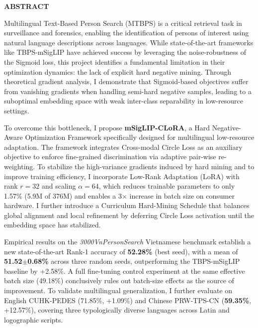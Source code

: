 \documentclass[../main.tex]{subfiles}
\begin{document}
\begin{center}
    \Large\textbf{ABSTRACT}
\end{center}

\vspace{1cm}


\noindent Multilingual Text-Based Person Search (MTBPS) is a critical retrieval task in surveillance and forensics, enabling the identification of persons of interest using natural language descriptions across languages. While state-of-the-art frameworks like TBPS-mSigLIP have achieved success by leveraging the noise-robustness of the Sigmoid loss, this project identifies a fundamental limitation in their optimization dynamics: the lack of explicit hard negative mining. Through theoretical gradient analysis, I demonstrate that Sigmoid-based objectives suffer from vanishing gradients when handling semi-hard negative samples, leading to a suboptimal embedding space with weak inter-class separability in low-resource settings.

\noindent To overcome this bottleneck, I propose \textbf{mSigLIP-CLoRA}, a Hard Negative-Aware Optimization Framework specifically designed for multilingual low-resource adaptation. The framework integrates Cross-modal Circle Loss as an auxiliary objective to enforce fine-grained discrimination via adaptive pair-wise re-weighting. To stabilize the high-variance gradients induced by hard mining and to improve training efficiency, I incorporate Low-Rank Adaptation (LoRA) with rank $r{=}32$ and scaling $\alpha{=}64$, which reduces trainable parameters to only 1.57\% (5.9M of 376M) and enables a 3$\times$ increase in batch size on consumer hardware. I further introduce a Curriculum Hard-Mining Schedule that balances global alignment and local refinement by deferring Circle Loss activation until the embedding space has stabilized.

\noindent Empirical results on the \textit{3000VnPersonSearch} Vietnamese benchmark establish a new state-of-the-art Rank-1 accuracy of \textbf{52.28\%} (best seed), with a mean of \textbf{51.52$\pm$0.68\%} across three random seeds, outperforming the TBPS-mSigLIP baseline by +2.58\%. A full fine-tuning control experiment at the same effective batch size (49.18\%) conclusively rules out batch-size effects as the source of improvement. To validate multilingual generalization, I further evaluate on English CUHK-PEDES (71.85\%, +1.09\%) and Chinese PRW-TPS-CN (\textbf{59.35\%}, +12.57\%), covering three typologically diverse languages across Latin and logographic scripts.
\end{document}
